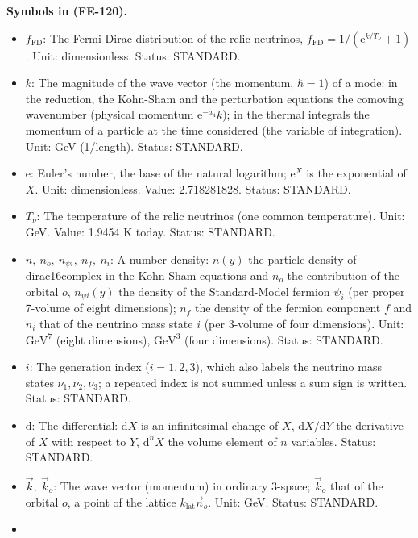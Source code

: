 \documentclass[
  10pt,
]{article}
\providecommand{\tightlist}{%
  \setlength{\itemsep}{0pt}\setlength{\parskip}{0pt}}
\begin{document}
\textbf{Symbols in (FE-120).}

\begin{itemize}
\tightlist
\item
  \(f_{\mathrm{FD}}\): The Fermi-Dirac distribution of the relic
  neutrinos, \(f_{\mathrm{FD}} = 1/(\mathrm{e}^{k/T_\nu} + 1)\). Unit:
  dimensionless. Status: STANDARD.
\item
  \(k\): The magnitude of the wave vector (the momentum, \(\hbar = 1\))
  of a mode: in the reduction, the Kohn-Sham and the perturbation
  equations the comoving wavenumber (physical momentum
  \(\mathrm{e}^{-a_4}k\)); in the thermal integrals the momentum of a
  particle at the time considered (the variable of integration). Unit:
  GeV (1/length). Status: STANDARD.
\item
  \(\mathrm{e}\): Euler's number, the base of the natural logarithm;
  \(\mathrm{e}^{X}\) is the exponential of \(X\). Unit: dimensionless.
  Value: 2.718281828. Status: STANDARD.
\item
  \(T_\nu\): The temperature of the relic neutrinos (one common
  temperature). Unit: GeV. Value: 1.9454 K today. Status: STANDARD.
\item
  \(n,\ n_o,\ n_{\psi i},\ n_f,\ n_i\): A number density: \(n(y)\) the
  particle density of dirac16complex in the Kohn-Sham equations and
  \(n_o\) the contribution of the orbital \(o\), \(n_{\psi i}(y)\) the
  density of the Standard-Model fermion \(\psi_i\) (per proper 7-volume
  of eight dimensions); \(n_f\) the density of the fermion component
  \(f\) and \(n_i\) that of the neutrino mass state \(i\) (per 3-volume
  of four dimensions). Unit: \(\mathrm{GeV}^{7}\) (eight dimensions),
  \(\mathrm{GeV}^{3}\) (four dimensions). Status: STANDARD.
\item
  \(i\): The generation index (\(i = 1, 2, 3\)), which also labels the
  neutrino mass states \(\nu_1, \nu_2, \nu_3\); a repeated index is not
  summed unless a sum sign is written. Status: STANDARD.
\item
  \(\mathrm{d}\): The differential: \(\mathrm{d}X\) is an infinitesimal
  change of \(X\), \(\mathrm{d}X/\mathrm{d}Y\) the derivative of \(X\)
  with respect to \(Y\), \(\mathrm{d}^nX\) the volume element of \(n\)
  variables. Status: STANDARD.
\item
  \(\vec k,\ \vec k_o\): The wave vector (momentum) in ordinary 3-space;
  \(\vec k_o\) that of the orbital \(o\), a point of the lattice
  \(k_{\mathrm{lat}}\vec n_o\). Unit: GeV. Status: STANDARD.
\item

\end{itemize}
\end{document}

